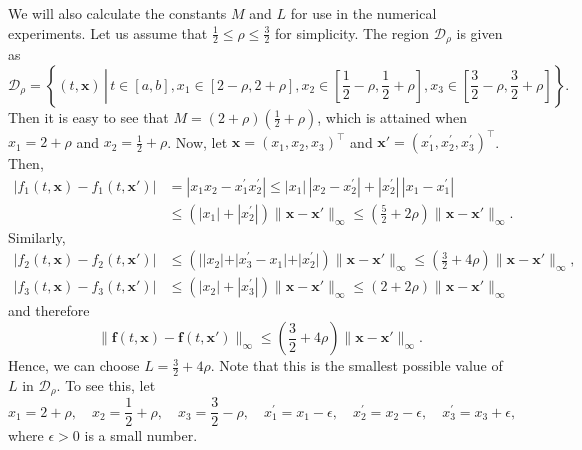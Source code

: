 \documentclass[pdflatex,sn-mathphys-num]{sn-jnl}%
\theoremstyle{thmstyleone}%
\theoremstyle{thmstyletwo}%
\theoremstyle{thmstylethree}%
\begin{document}
\begin{appendices}
We will also calculate the constants $M$ and $L$ for use in the numerical experiments. Let us assume that $\frac{1}{2}\le \rho\le \frac{3}{2}$ for simplicity.  The region $\mathcal{D}_{\rho}$ is given as
\begin{equation}
\mathcal{D}_{\rho}=\left\{(t,{\bm x})\,\left|\,t\in[a,b], x_1\in\left[2-\rho, 2+\rho\right], x_2\in\left[\frac{1}{2}-\rho, \frac{1}{2}+\rho\right], x_3\in\left[\frac{3}{2}-\rho, \frac{3}{2}+\rho\right]\right.\right\}.
\end{equation}
Then it is easy to see that $M=(2+\rho)(\frac{1}{2}+\rho)$, which is attained when $x_1=2+\rho$ and $x_2=\frac{1}{2}+\rho$. Now, let ${\bm x}=(x_1,x_2,x_3)^{\top}$ and ${\bm x}'=(x_1^{\prime},x_2^{\prime},x_3^{\prime})^{\top}$. Then,
\begin{align}
|f_1(t,{\bm x})-f_1(t,{\bm x}')| &= |x_1 x_2-x_1^{\prime}x_2^{\prime}| \le |x_1|\,|x_2-x_2^{\prime}| + |x_2^{\prime}|\,|x_1-x_1^{\prime}| \nonumber \\
&\le (|x_1|+|x_2^{\prime}|)\|{\bm x}-{\bm x}'\|_{\infty} \le \left(\frac{5}{2}+2\rho\right)\|{\bm x}-{\bm x}'\|_{\infty}.
\end{align}
Similarly,
\begin{align}
|f_2(t,{\bm x})-f_2(t,{\bm x}')| &\le (||x_2|+|x_3^{\prime}-x_1|+|x_2^{\prime}|)\|{\bm x}-{\bm x}'\|_{\infty} \le \left(\frac{3}{2}+4\rho\right)\|{\bm x}-{\bm x}'\|_{\infty}, \\
|f_3(t,{\bm x})-f_3(t,{\bm x}')| &\le (|x_2|+|x_3^{\prime}|)\|{\bm x}-{\bm x}'\|_{\infty} \le (2+2\rho)\|{\bm x}-{\bm x}'\|_{\infty}
\end{align}
and therefore
\begin{equation}
\|{\bm f}(t,{\bm x})-{\bm f}(t,{\bm x}')\|_{\infty} \le \left(\frac{3}{2}+4\rho\right)\|{\bm x}-{\bm x}'\|_{\infty}.
\end{equation}
Hence, we can choose $L=\frac{3}{2}+4\rho$. Note that this is the smallest possible value of $L$ in $\mathcal{D}_{\rho}$. To see this, let
\begin{equation}
x_1=2+\rho, \quad x_2=\frac{1}{2}+\rho, \quad x_3=\frac{3}{2}-\rho, \quad x_1^{\prime}=x_1-\epsilon, \quad x_2^{\prime}=x_2-\epsilon, \quad x_3^{\prime}=x_3+\epsilon,
\end{equation}
where $\epsilon>0$ is a small number.
\end{appendices}
\end{document}
